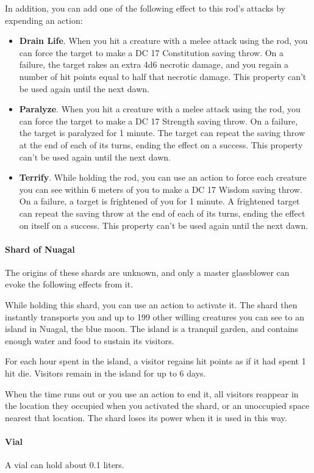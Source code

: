     In addition, you can add one of the following effect to this rod's attacks by expending an action:
    \begin{itemize}
        \item \textbf{Drain Life}.
        When you hit a creature with a melee attack using the rod, you can force the target to make a DC 17 Constitution saving throw.
        On a failure, the target rakes an extra 4d6 necrotic damage, and you regain a number of hit points equal to half that necrotic damage.
        This property can't be used again until the next dawn.
        \item \textbf{Paralyze}.
        When you hit a creature with a melee attack using the rod, you can force the target to make a DC 17 Strength saving throw.
        On a failure, the target is paralyzed for 1 minute.
        The target can repeat the saving throw at the end of each of its turns, ending the effect on a success.
        This property can't be used again until the next dawn.
        \item \textbf{Terrify}. %
        While holding the rod, you can use an action to force each creature you can see within 6 meters of you to make a DC 17 Wisdom saving throw.
        On a failure, a target is frightened of you for 1 minute.
        A frightened target can repeat the saving throw at the end of each of its turns, ending the effect on itself on a success.
        This property can't be used again until the next dawn.
    \end{itemize}
\paragraph{Shard of Nuagal}
    The origins of these shards are unknown, and only a master glassblower can evoke the following effects from it.

    While holding this shard, you can use an action to activate it.
    The shard then instantly transports you and up to 199 other willing creatures you can see to an island in Nuagal, the blue moon.
    The island is a tranquil garden, and contains enough water and food to sustain its visitors.

    For each hour spent in the island, a visitor regains hit points as if it had spent 1 hit die.
    Visitors remain in the island for up to 6 days.

    When the time runs out or you use an action to end it, all visitors reappear in the location they occupied when you activated the shard, or an unoccupied space nearest that location.
    The shard loses its power when it is used in this way.
\paragraph{Vial}
    A vial can hold about 0.1 liters.
